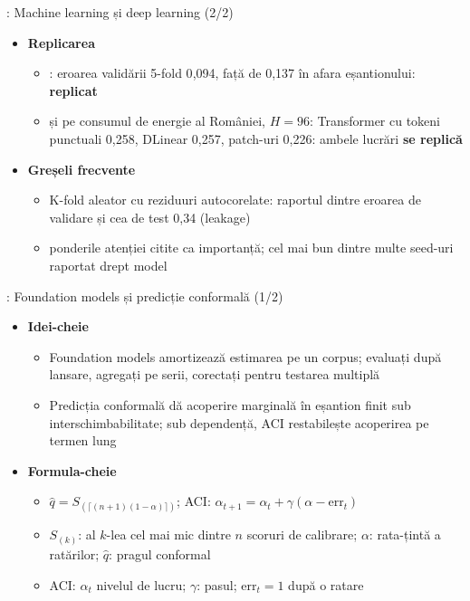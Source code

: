 \begin{frame}{: Machine learning și deep learning (2/2)}
\itemsize{\small}
\begin{itemize}
    \item \textbf{Replicarea}
    \begin{itemize}
        \item {}: eroarea validării 5-fold 0{,}094, față de 0{,}137 în afara eșantionului: \textbf{replicat}
        \item {} și  pe consumul de energie al României, $H = 96$: Transformer cu tokeni punctuali 0{,}258, DLinear 0{,}257, patch-uri 0{,}226: ambele lucrări \textbf{se replică}
    \end{itemize}
    \item \textbf{Greșeli frecvente}
    \begin{itemize}
        \item K-fold aleator cu reziduuri autocorelate: raportul dintre eroarea de validare și cea de test 0{,}34 (leakage)
        \item ponderile atenției citite ca importanță; cel mai bun dintre multe seed-uri raportat drept model
    \end{itemize}
\end{itemize}
\end{frame}

\begin{frame}{: Foundation models și predicție conformală (1/2)}
\itemsize{\footnotesize}
\begin{itemize}
    \item \textbf{Idei-cheie}
    \begin{itemize}
        \item Foundation models amortizează estimarea pe un corpus; evaluați după lansare, agregați pe serii, corectați pentru testarea multiplă
        \item Predicția conformală dă acoperire marginală în eșantion finit sub interschimbabilitate; sub dependență, ACI restabilește acoperirea pe termen lung
    \end{itemize}
    \item \textbf{Formula-cheie}
    \begin{itemize}
        \item $\hat q = S_{(\lceil(n + 1)(1 - \alpha)\rceil)}$; ACI: $\alpha_{t+1} = \alpha_t + \gamma(\alpha - \mathrm{err}_t)$
        \item $S_{(k)}$: al $k$-lea cel mai mic dintre $n$ scoruri de calibrare; $\alpha$: rata-țintă a ratărilor; $\hat q$: pragul conformal
        \item ACI: $\alpha_t$ nivelul de lucru; $\gamma$: pasul; $\mathrm{err}_t = 1$ după o ratare
    \end{itemize}
\end{itemize}
\end{frame}

